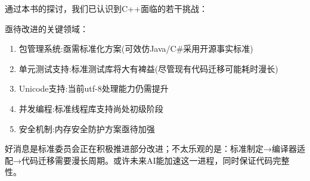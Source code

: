 通过本书的探讨，我们已认识到C++面临的若干挑战：

亟待改进的关键领域：

\begin{enumerate}
\item 
包管理系统:亟需标准化方案(可效仿Java/C\#采用开源事实标准)

\item 
单元测试支持:标准测试库将大有裨益(尽管现有代码迁移可能耗时漫长)

\item 
Unicode支持:当前utf-8处理能力仍需提升

\item 
并发编程:标准线程库支持尚处初级阶段

\item 
安全机制:内存安全防护方案亟待加强
\end{enumerate}

好消息是标准委员会正在积极推进部分改进；不太乐观的是：标准制定→编译器适配→代码迁移需要漫长周期。或许未来AI能加速这一进程，同时保证代码完整性。










